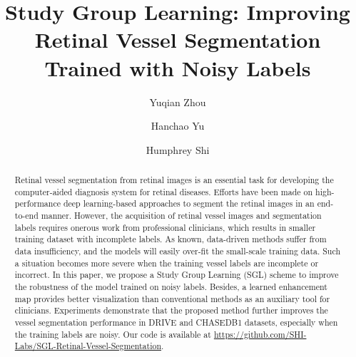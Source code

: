 \documentclass[runningheads]{llncs}
\begin{document}
\title{Study Group Learning: Improving Retinal Vessel Segmentation Trained with Noisy Labels }
\author{Yuqian Zhou \and
Hanchao Yu\and
Humphrey Shi}



\maketitle              \begin{abstract}
Retinal vessel segmentation from retinal images is an essential task for developing the computer-aided diagnosis system for retinal diseases. Efforts have been made on high-performance deep learning-based approaches to segment the retinal images in an end-to-end manner. However, the acquisition of retinal vessel images and segmentation labels requires onerous work from professional clinicians, which results in smaller training dataset with incomplete labels. As known, data-driven methods suffer from data insufficiency, and the models will easily over-fit the small-scale training data. Such a situation becomes more severe when the training vessel labels are incomplete or incorrect. In this paper, we propose a Study Group Learning (SGL) scheme to improve the robustness of the model trained on noisy labels. Besides, a learned enhancement map provides better visualization than conventional methods as an auxiliary tool for clinicians. Experiments demonstrate that the proposed method further improves the vessel segmentation performance in DRIVE and CHASEDB1 datasets, especially when the training labels are noisy. Our code is available at {\color{magenta} \url{https://github.com/SHI-Labs/SGL-Retinal-Vessel-Segmentation}}.

\end{abstract}
\end{document}
